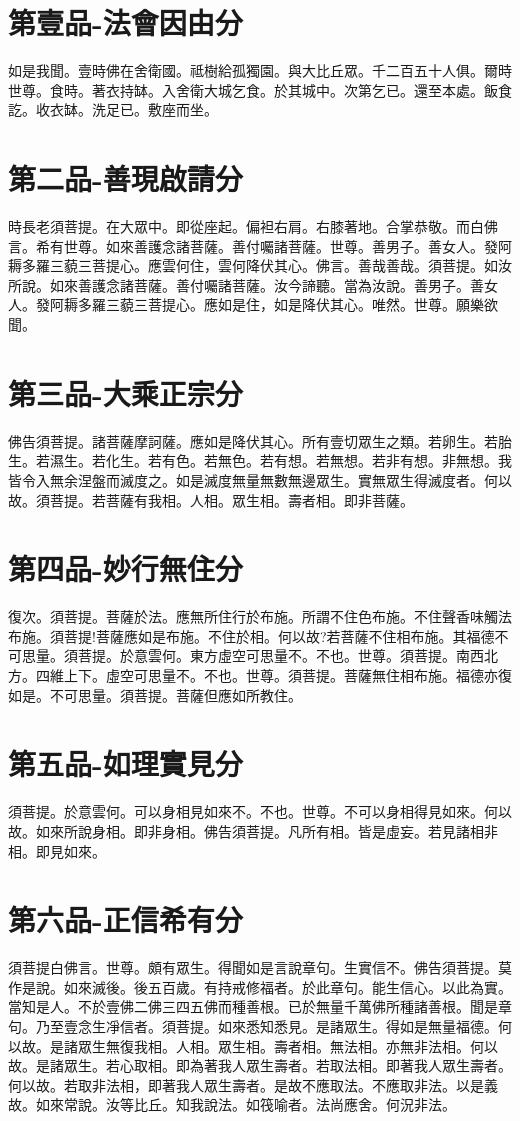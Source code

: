 \documentclass[a6paper, 22pt, twocolumn]{cvertbook}
\begin{document}
\inmain


\chapter{第壹品-法會因由分}
如是我聞。壹時佛在舍衛國。祗樹給孤獨園。與大比丘眾。千二百五十人俱。爾時世尊。食時。著衣持缽。入舍衛大城乞食。於其城中。次第乞已。還至本處。飯食訖。收衣缽。洗足已。敷座而坐。
\chapter{第二品-善現啟請分}
時長老須菩提。在大眾中。即從座起。偏袒右肩。右膝著地。合掌恭敬。而白佛言。希有世尊。如來善護念諸菩薩。善付囑諸菩薩。世尊。善男子。善女人。發阿耨多羅三藐三菩提心。應雲何住，雲何降伏其心。佛言。善哉善哉。須菩提。如汝所說。如來善護念諸菩薩。善付囑諸菩薩。汝今諦聽。當為汝說。善男子。善女人。發阿耨多羅三藐三菩提心。應如是住，如是降伏其心。唯然。世尊。願樂欲聞。
\chapter{第三品-大乘正宗分}
佛告須菩提。諸菩薩摩訶薩。應如是降伏其心。所有壹切眾生之類。若卵生。若胎生。若濕生。若化生。若有色。若無色。若有想。若無想。若非有想。非無想。我皆令入無余涅盤而滅度之。如是滅度無量無數無邊眾生。實無眾生得滅度者。何以故。須菩提。若菩薩有我相。人相。眾生相。壽者相。即非菩薩。
\chapter{第四品-妙行無住分}
復次。須菩提。菩薩於法。應無所住行於布施。所謂不住色布施。不住聲香味觸法布施。須菩提!菩薩應如是布施。不住於相。何以故?若菩薩不住相布施。其福德不可思量。須菩提。於意雲何。東方虛空可思量不。不也。世尊。須菩提。南西北方。四維上下。虛空可思量不。不也。世尊。須菩提。菩薩無住相布施。福德亦復如是。不可思量。須菩提。菩薩但應如所教住。
\chapter{第五品-如理實見分}
須菩提。於意雲何。可以身相見如來不。不也。世尊。不可以身相得見如來。何以故。如來所說身相。即非身相。佛告須菩提。凡所有相。皆是虛妄。若見諸相非相。即見如來。
\chapter{第六品-正信希有分}
須菩提白佛言。世尊。頗有眾生。得聞如是言說章句。生實信不。佛告須菩提。莫作是說。如來滅後。後五百歲。有持戒修福者。於此章句。能生信心。以此為實。當知是人。不於壹佛二佛三四五佛而種善根。已於無量千萬佛所種諸善根。聞是章句。乃至壹念生凈信者。須菩提。如來悉知悉見。是諸眾生。得如是無量福德。何以故。是諸眾生無復我相。人相。眾生相。壽者相。無法相。亦無非法相。何以故。是諸眾生。若心取相。即為著我人眾生壽者。若取法相。即著我人眾生壽者。何以故。若取非法相，即著我人眾生壽者。是故不應取法。不應取非法。以是義故。如來常說。汝等比丘。知我說法。如筏喻者。法尚應舍。何況非法。
\end{document}
